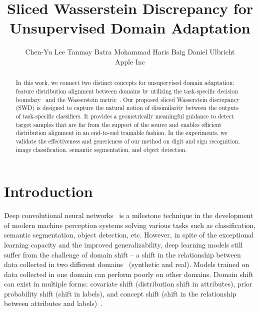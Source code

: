 \documentclass[10pt,twocolumn,letterpaper]{article}
\begin{document}
\title{Sliced Wasserstein Discrepancy for Unsupervised Domain Adaptation}


\author{Chen-Yu Lee \hspace{6mm} Tanmay Batra \hspace{6mm} Mohammad Haris Baig \hspace{6mm} Daniel Ulbricht\\
  Apple Inc\\
  }
  
\maketitle


\begin{abstract}
In this work, we connect two distinct concepts for unsupervised domain adaptation: feature distribution alignment between domains by utilizing the task-specific decision boundary~\cite{saito2017maximum} and the Wasserstein metric~\cite{villani2009optimal}. Our proposed sliced Wasserstein discrepancy (SWD) is designed to capture the natural notion of dissimilarity between the outputs of task-specific classifiers. It provides a geometrically meaningful guidance to detect target samples that are far from the support of the source and enables efficient distribution alignment in an end-to-end trainable fashion. In the experiments, we validate the effectiveness and genericness of our method on digit and sign recognition, image classification, semantic segmentation, and object detection.

\end{abstract}



\section{Introduction}


Deep convolutional neural networks~\cite{krizhevsky2012imagenet} is a milestone technique in the development of modern machine perception systems solving various tasks such as classification, semantic segmentation, object detection, etc.
However, in spite of the exceptional learning capacity and the improved generalizability, deep learning models still suffer from the challenge of domain shift -- a shift in the relationship between data collected in two different domains~\cite{ben2007analysis, ben2010theory} (\eg synthetic and real). 
Models trained on data collected in one domain can perform poorly on other domains.
Domain shift can exist in multiple forms: covariate shift (distribution shift in attributes), prior probability shift (shift in labels), and concept shift (shift in the relationship between attributes and labels)~\cite{shimodaira2000improving, storkey2009training, moreno2012unifying}.
\end{document}
